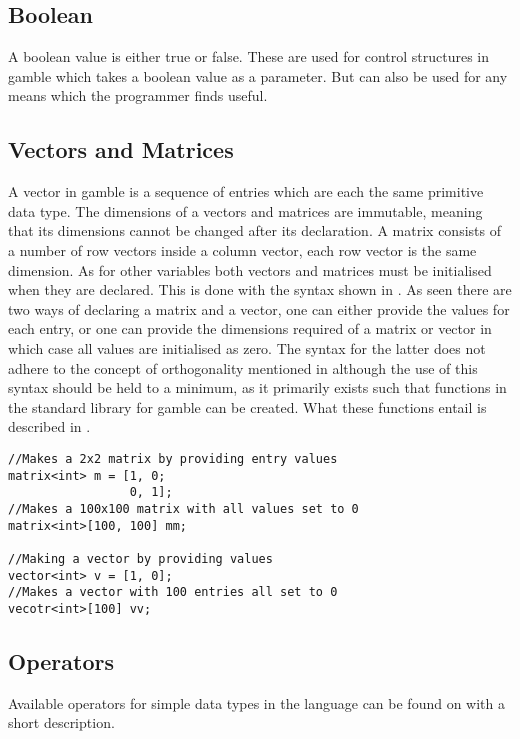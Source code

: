 \subsection*{Boolean}
A boolean value is either true or false. 
These are used for control structures in \gls{gamble} which takes a boolean value as a parameter. 
But can also be used for any means which the programmer finds useful. 

\subsection*{Vectors and Matrices}
A vector in \gls{gamble} is a sequence of entries which are each the same primitive data type. 
The dimensions of a vectors and matrices are immutable, meaning that its dimensions cannot be changed after its declaration. 
A matrix consists of a number of row vectors inside a column vector, each row vector is the same dimension. 
As for other variables both vectors and matrices must be initialised when they are declared. 
This is done with the syntax shown in .
As seen there are two ways of declaring a matrix and a vector, one can either provide the values for each entry, or one can provide the dimensions required of a matrix or vector in which case all values are initialised as zero.
The syntax for the latter does not adhere to the concept of orthogonality mentioned in  although the use of this syntax should be held to a minimum, as it primarily exists such that functions in the standard library for \gls{gamble} can be created.
What these functions entail is described in .

\begin{lstlisting}[caption={Syntax for creating a matrix or vector},label={lst:matrix},numbers=none]
//Makes a 2x2 matrix by providing entry values
matrix<int> m = [1, 0; 
                 0, 1];
//Makes a 100x100 matrix with all values set to 0
matrix<int>[100, 100] mm;

//Making a vector by providing values
vector<int> v = [1, 0];
//Makes a vector with 100 entries all set to 0
vecotr<int>[100] vv;
\end{lstlisting}

\subsection*{Operators}\label{subsec:operators}
Available operators for simple data types in the language can be found on  with a short description.  

